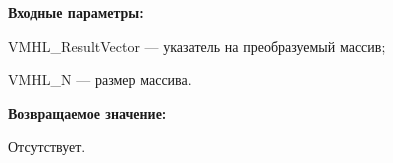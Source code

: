 \textbf{Входные параметры:}
 
VMHL\_ResultVector --- указатель на преобразуемый массив;
 
VMHL\_N --- размер массива.

\textbf{Возвращаемое значение:}

Отсутствует.